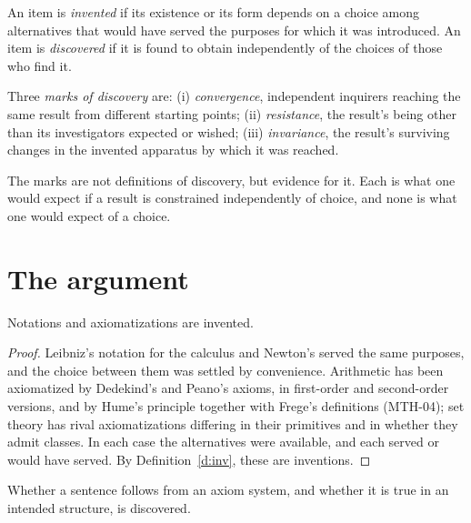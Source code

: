 \documentclass{situationist-preprint}
\begin{document}
\begin{definition}\label{d:inv}
An item is \emph{invented} if its existence or its form depends on a choice among alternatives that would have served the purposes for which it was introduced. An item is \emph{discovered} if it is found to obtain independently of the choices of those who find it.
\end{definition}

\begin{definition}\label{d:marks}
Three \emph{marks of discovery} are: (i) \emph{convergence}, independent inquirers reaching the same result from different starting points; (ii) \emph{resistance}, the result's being other than its investigators expected or wished; (iii) \emph{invariance}, the result's surviving changes in the invented apparatus by which it was reached.
\end{definition}

The marks are not definitions of discovery, but evidence for it. Each is what one would expect if a result is constrained independently of choice, and none is what one would expect of a choice.

\section{The argument}

\begin{proposition}\label{p:inv}
Notations and axiomatizations are invented.
\end{proposition}

\begin{proof}
Leibniz's notation for the calculus and Newton's served the same purposes, and the choice between them was settled by convenience. Arithmetic has been axiomatized by Dedekind's and Peano's axioms, in first-order and second-order versions, and by Hume's principle together with Frege's definitions (MTH-04); set theory has rival axiomatizations differing in their primitives and in whether they admit classes. In each case the alternatives were available, and each served or would have served. By Definition~\ref{d:inv}, these are inventions.
\end{proof}

\begin{proposition}\label{p:disc}
Whether a sentence follows from an axiom system, and whether it is true in an intended structure, is discovered.
\end{proposition}
\end{document}
